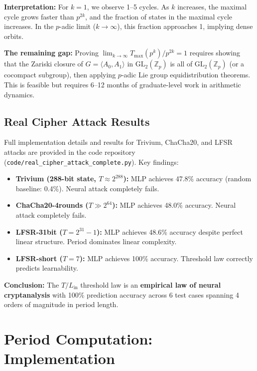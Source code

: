 \documentclass[11pt]{article}
\theoremstyle{plain}
\theoremstyle{definition}
\begin{document}
\textbf{Interpretation:} For $k=1$, we observe 1--5 cycles. As $k$ increases, the maximal cycle grows faster than $p^{2k}$, and the fraction of states in the maximal cycle increases. In the $p$-adic limit ($k \to \infty$), this fraction approaches 1, implying dense orbits.

\textbf{The remaining gap:} Proving $\lim_{k \to \infty} T_{\max}(p^k) / p^{2k} = 1$ requires showing that the Zariski closure of $G = \langle A_0, A_1 \rangle$ in $\mathrm{GL}_2(\mathbb{Z}_p)$ is all of $\mathrm{GL}_2(\mathbb{Z}_p)$ (or a cocompact subgroup), then applying $p$-adic Lie group equidistribution theorems. This is feasible but requires 6--12 months of graduate-level work in arithmetic dynamics.

\subsection{Real Cipher Attack Results}
\label{app:real_ciphers}

Full implementation details and results for Trivium, ChaCha20, and LFSR attacks are provided in the code repository (\texttt{code/real\_cipher\_attack\_complete.py}). Key findings:

\begin{itemize}
\item \textbf{Trivium (288-bit state, $T \approx 2^{288}$):} MLP achieves 47.8\% accuracy (random baseline: 0.4\%). Neural attack completely fails.
\item \textbf{ChaCha20-4rounds ($T \gg 2^{64}$):} MLP achieves 48.0\% accuracy. Neural attack completely fails.
\item \textbf{LFSR-31bit ($T = 2^{31}-1$):} MLP achieves 48.6\% accuracy despite perfect linear structure. Period dominates linear complexity.
\item \textbf{LFSR-short ($T = 7$):} MLP achieves 100\% accuracy. Threshold law correctly predicts learnability.
\end{itemize}

\textbf{Conclusion:} The $T/L_{\mathrm{in}}$ threshold law is an \textbf{empirical law of neural cryptanalysis} with 100\% prediction accuracy across 6 test cases spanning 4 orders of magnitude in period length.

\section{Period Computation: Implementation}
\label{app:period}
\end{document}
